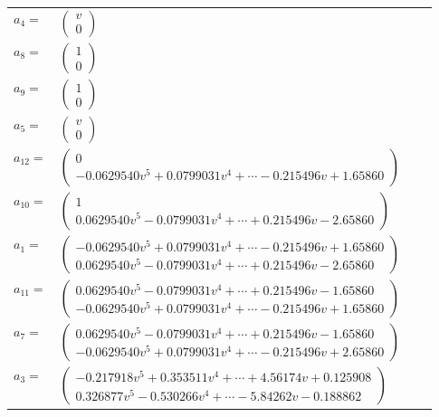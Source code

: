 \documentclass[1p]{elsarticle_modified}
\theoremstyle{definition}
\begin{document}
\begin{tabular}{m{7pt} m{180pt} m{7pt} m{180pt} }
\flushright $a_{4}=$&$\begin{pmatrix}v\\0\end{pmatrix}$ \\
\flushright $a_{8}=$&$\begin{pmatrix}1\\0\end{pmatrix}$ \\
\flushright $a_{9}=$&$\begin{pmatrix}1\\0\end{pmatrix}$ \\
\flushright $a_{5}=$&$\begin{pmatrix}v\\0\end{pmatrix}$ \\
\flushright $a_{12}=$&$\begin{pmatrix}0\\-0.0629540 v^{5}+0.0799031 v^{4}+\cdots-0.215496 v+1.65860\end{pmatrix}$ \\
\flushright $a_{10}=$&$\begin{pmatrix}1\\0.0629540 v^{5}-0.0799031 v^{4}+\cdots+0.215496 v-2.65860\end{pmatrix}$ \\
\flushright $a_{1}=$&$\begin{pmatrix}-0.0629540 v^{5}+0.0799031 v^{4}+\cdots-0.215496 v+1.65860\\0.0629540 v^{5}-0.0799031 v^{4}+\cdots+0.215496 v-2.65860\end{pmatrix}$ \\
\flushright $a_{11}=$&$\begin{pmatrix}0.0629540 v^{5}-0.0799031 v^{4}+\cdots+0.215496 v-1.65860\\-0.0629540 v^{5}+0.0799031 v^{4}+\cdots-0.215496 v+1.65860\end{pmatrix}$ \\
\flushright $a_{7}=$&$\begin{pmatrix}0.0629540 v^{5}-0.0799031 v^{4}+\cdots+0.215496 v-1.65860\\-0.0629540 v^{5}+0.0799031 v^{4}+\cdots-0.215496 v+2.65860\end{pmatrix}$ \\
\flushright $a_{3}=$&$\begin{pmatrix}-0.217918 v^{5}+0.353511 v^{4}+\cdots+4.56174 v+0.125908\\0.326877 v^{5}-0.530266 v^{4}+\cdots-5.84262 v-0.188862\end{pmatrix}$ \\

\end{tabular}
\end{document}
